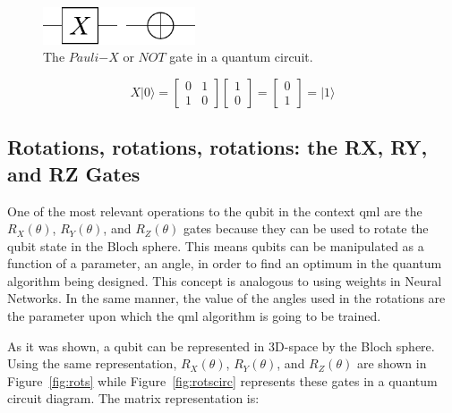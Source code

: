 \begin{figure}[!htbp]
\centering
	\includegraphics[width=0.40\textwidth]{figures/X.pdf}
\caption{The $Pauli\mathrm{-}X$ or $NOT$ gate in a quantum circuit.}
\label{fig:circuitX}
\end{figure}

\begin{linenomath}
\begin{equation}
	X\vert 0 \rangle=\begin{bmatrix} 0 & 1 \\ 1 & 0 \end{bmatrix} \begin{bmatrix} 1 \\ 0 \end{bmatrix} = \begin{bmatrix} 0 \\ 1 \end{bmatrix} = \vert 1 \rangle
\label{eq:flipped}
\end{equation}
\end{linenomath}

\subsection{Rotations, rotations, rotations: the RX, RY, and RZ Gates}
\label{sec:rot}

One of the most relevant operations to the qubit in the context \gls{qml} are 
the $R_X(\theta)$, $R_Y(\theta)$, and $R_Z(\theta)$ gates because they can be 
used to rotate the qubit state in the Bloch sphere. This means qubits can be 
manipulated as a function of a parameter, an angle, in order to find an optimum 
in the quantum algorithm being designed. This concept is analogous to using 
weights in Neural Networks. In the same manner, the value of the angles used in 
the rotations are the parameter upon which the \gls{qml} algorithm is going to 
be trained.

As it was shown, a qubit can be represented in 3D-space by the Bloch sphere. 
Using the same representation, $R_X(\theta)$, $R_Y(\theta)$, and $R_Z(\theta)$ 
are shown in Figure~\ref{fig:rots} while Figure~\ref{fig:rotscirc} represents 
these gates in a quantum circuit diagram. The matrix representation is:

